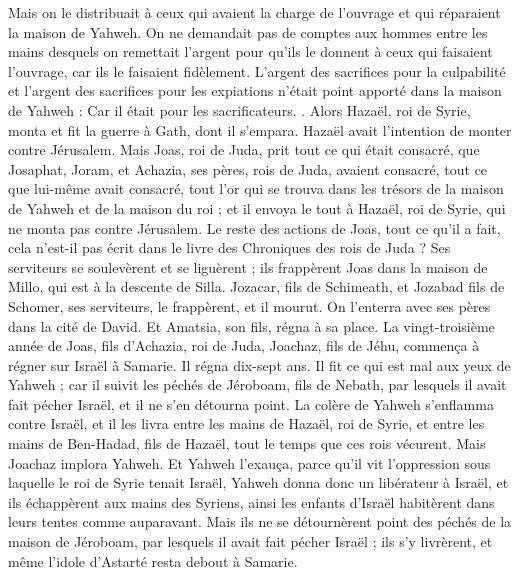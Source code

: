 \begin{multicols}{2}
Mais on le distribuait à ceux qui avaient la charge de l'ouvrage et qui réparaient la maison de Yahweh.
On ne demandait pas de comptes aux hommes entre les mains desquels on remettait l'argent pour qu'ils le donnent à ceux qui faisaient l'ouvrage, car ils le faisaient fidèlement.
L'argent des sacrifices pour la culpabilité et l'argent des sacrifices pour les expiations n'était point apporté dans la maison de Yahweh : Car il était pour les sacrificateurs.
.
Alors Hazaël, roi de Syrie, monta et fit la guerre à Gath, dont il s'empara. Hazaël avait l'intention de monter contre Jérusalem.
Mais Joas, roi de Juda, prit tout ce qui était consacré, que Josaphat, Joram, et Achazia, ses pères, rois de Juda, avaient consacré, tout ce que lui-même avait consacré, tout l'or qui se trouva dans les trésors de la maison de Yahweh et de la maison du roi ; et il envoya le tout à Hazaël, roi de Syrie, qui ne monta pas contre Jérusalem.
Le reste des actions de Joas, tout ce qu'il a fait, cela n'est-il pas écrit dans le livre des Chroniques des rois de Juda ?
Ses serviteurs se soulevèrent et se liguèrent ; ils frappèrent Joas dans la maison de Millo, qui est à la descente de Silla.
Jozacar, fils de Schimeath, et Jozabad fils de Schomer, ses serviteurs, le frappèrent, et il mourut. On l'enterra avec ses pères dans la cité de David. Et Amatsia, son fils, régna à sa place.
\VerseOne{}La vingt-troisième année de Joas, fils d'Achazia, roi de Juda, Joachaz, fils de Jéhu, commença à régner sur Israël à Samarie. Il régna dix-sept ans.
Il fit ce qui est mal aux yeux de Yahweh ; car il suivit les péchés de Jéroboam, fils de Nebath, par lesquels il avait fait pécher Israël, et il ne s'en détourna point.
La colère de Yahweh s'enflamma contre Israël, et il les livra entre les mains de Hazaël, roi de Syrie, et entre les mains de Ben-Hadad, fils de Hazaël, tout le temps que ces rois vécurent.
Mais Joachaz implora Yahweh. Et Yahweh l'exauça, parce qu'il vit l'oppression sous laquelle le roi de Syrie tenait Israël,
Yahweh donna donc un libérateur à Israël, et ils échappèrent aux mains des Syriens, ainsi les enfants d'Israël habitèrent dans leurs tentes comme auparavant.
Mais ils ne se détournèrent point des péchés de la maison de Jéroboam, par lesquels il avait fait pécher Israël ; ils s'y livrèrent, et même l'idole d'Astarté resta debout à Samarie.

\end{multicols}
